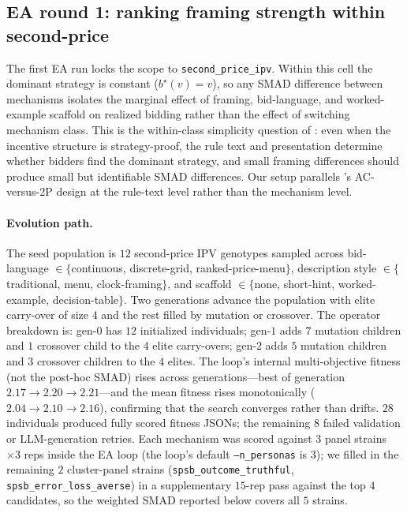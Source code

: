 \documentclass[12pt]{article}
\begin{document}
\subsection{EA round 1: ranking framing strength within second-price}
\label{sec:ea-secondprice}

The first EA run locks the scope to \texttt{second\_price\_ipv}.
Within this cell the dominant strategy is constant
($b^\star(v) = v$), so any SMAD difference between mechanisms
isolates the marginal effect of framing, bid-language, and
worked-example scaffold on realized bidding rather than the effect
of switching mechanism class. This is the within-class simplicity
question of \citet{li2024simple}: even when the incentive structure
is strategy-proof, the rule text and presentation determine whether
bidders find the dominant strategy, and small framing differences
should produce small but identifiable SMAD differences. Our setup
parallels \citet{li2017}'s AC-versus-2P design at the rule-text
level rather than the mechanism level.

\paragraph{Evolution path.} The seed population is $12$ second-price
IPV genotypes sampled across bid-language $\in\{$continuous,
discrete-grid, ranked-price-menu$\}$, description style
$\in\{$traditional, menu, clock-framing$\}$, and scaffold
$\in\{$none, short-hint, worked-example, decision-table$\}$. Two
generations advance the population with elite carry-over of size
$4$ and the rest filled by mutation or crossover. The operator
breakdown is: gen-$0$ has $12$ initialized individuals; gen-$1$
adds $7$ mutation children and $1$ crossover child to the $4$
elite carry-overs; gen-$2$ adds $5$ mutation children and $3$
crossover children to the $4$ elites. The loop's internal
multi-objective fitness (not the post-hoc SMAD) rises across
generations---best of generation $2.17 \to 2.20 \to 2.21$---and
the mean fitness rises monotonically ($2.04 \to 2.10 \to 2.16$),
confirming that the search converges rather than drifts. $28$
individuals produced fully scored fitness JSONs; the remaining
$8$ failed validation or LLM-generation retries. Each mechanism
was scored against $3$ panel strains $\times 3$ reps inside the EA
loop (the loop's default \texttt{--n\_personas} is $3$); we filled
in the remaining $2$ cluster-panel strains
(\texttt{spsb\_outcome\_truthful},
\texttt{spsb\_error\_loss\_averse}) in a supplementary $15$-rep
pass against the top $4$ candidates, so the weighted SMAD
reported below covers all $5$ strains.
\end{document}
